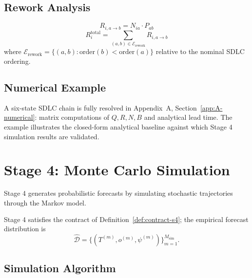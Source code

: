 \subsection{Rework Analysis}
\label{sec:s3-rework}

\begin{definition}
\label{def:rework}
\begin{equation}
\label{eq:rework-intensity}
R_{i,a \to b} = N_{ia} \cdot P_{ab}
\end{equation}
\begin{equation}
\label{eq:total-rework}
R_i^{\text{total}} = \sum_{(a,b) \in \mathcal{E}_{\text{rework}}} R_{i,a \to b}
\end{equation}
where $\mathcal{E}_{\text{rework}} = \{(a, b) : \text{order}(b) < \text{order}(a)\}$
relative to the nominal SDLC ordering.
\end{definition}


\subsection{Numerical Example}
\label{sec:s3-example}

A six-state SDLC chain is fully resolved in Appendix~A,
Section~\ref{app:A-numerical}: matrix computations of $Q, R, N, B$ and
analytical lead time. The example illustrates the closed-form analytical
baseline against which Stage 4 simulation results are validated.


\section{Stage 4: Monte Carlo Simulation}
\label{sec:stage4}

Stage 4 generates probabilistic forecasts by simulating stochastic
trajectories through the Markov model.

Stage 4 satisfies the contract of Definition~\ref{def:contract-s4}; the
empirical forecast distribution is
\begin{equation}
\label{eq:forecast-distribution}
\hat{\mathcal{D}} = \{(T^{(m)}, o^{(m)}, \psi^{(m)})\}_{m=1}^{M_{\text{sim}}}.
\end{equation}


\subsection{Simulation Algorithm}
\label{sec:s4-algorithm}


